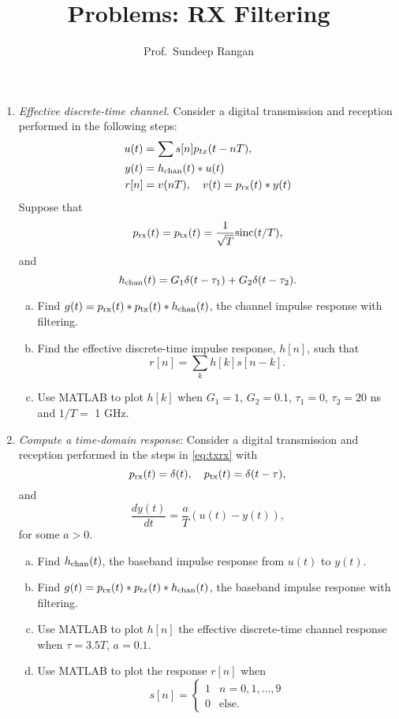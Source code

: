 \documentclass[11pt]{article}
\begin{document}
\title{Problems:  RX Filtering}
\author{Prof.\ Sundeep Rangan}
\date{}

\maketitle

\begin{enumerate}

\item \emph{Effective discrete-time channel.}
Consider a digital transmission and reception performed in the following steps:
\begin{align} \label{eq:txrx}
\begin{split}
    u(t) &= \sum s[n] p_{tx}(t-nT), \\
    y(t) &= h_{\rm chan}(t) * u(t) \\
    r[n] &= v(nT), \quad v(t) = p_{\rm rx}(t) * y(t)
\end{split}
\end{align}
Suppose that
\[
    p_{\rm rx}(t) = p_{\rm tx}(t) = \frac{1}{\sqrt{T}}\mathrm{sinc}(t/T),
\]
and
\[
    h_{\rm chan}(t) = G_1 \delta(t-\tau_1) + G_2 \delta(t-\tau_2).
\]
\begin{enumerate}[(a)]
\item Find $g(t) = p_{\rm rx}(t)*p_{\rm tx}(t)*h_{\rm chan}(t)$,
the channel impulse response with filtering.
\item Find the effective discrete-time impulse response, $h[n]$,
such that
\[
    r[n] = \sum_k h[k]s[n-k].
\]
\item Use MATLAB to plot $h[k]$ when $G_1=1$, $G_2=0.1$,
$\tau_1 = 0$,  $\tau_2 = 20$ ns and $1/T=$ 1 GHz.
\end{enumerate}

\item \emph{Compute a time-domain response}:
Consider a digital transmission and reception performed in the  steps
in \eqref{eq:txrx} with
\[
    p_{\rm rx}(t) = \delta(t), \quad p_{\rm tx}(t) = \delta(t-\tau),
\]
and
\[
    \frac{dy(t)}{dt} = \frac{a}{T}(u(t) - y(t)),
\]
for some $a> 0$.
\begin{enumerate}[(a)]
\item Find $h_{\rm chan}(t)$, the baseband impulse response from $u(t)$ to $y(t)$.
\item Find $g(t)=p_{\rm rx}(t)*p_{tx}(t)*h_{\rm chan}(t)$, the baseband impulse
response with filtering.
\item Use MATLAB to plot $h[n]$ the effective discrete-time channel response when $\tau=3.5 T$,
$a=0.1$.
\item Use MATLAB to plot the response $r[n]$ when
\[
    s[n] = \begin{cases}
        1 & n =0,1,\ldots,9 \\
        0 & \mbox{else.}
    \end{cases}
\]
\end{enumerate}



\end{enumerate}
\end{document}
